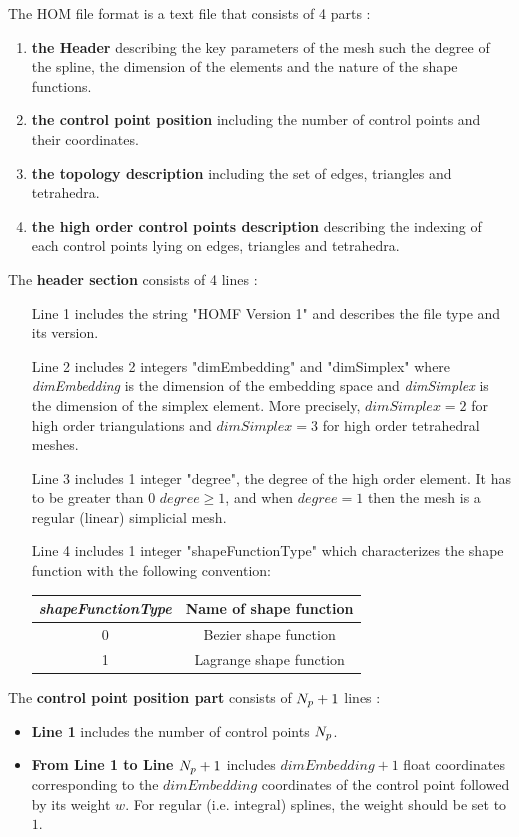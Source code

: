 \documentclass[a4paper,11pt]{article}
\begin{document}
The HOM file format is a text file that consists of 4 parts :
\begin{enumerate}
	\item {\bf the Header} describing the key parameters of the mesh such the degree of the spline, the dimension of the elements and the nature of the shape functions.
	\item {\bf the control point position} including the number of control points and their coordinates.
	\item {\bf the topology description} including the set of edges, triangles and tetrahedra. 
	\item {\bf the high order control points description} describing the indexing of each control points lying on edges, triangles and tetrahedra. 				
\end{enumerate}

The {\bf header section} consists of 4 lines :
\begin{itemize}
	\item[Line 1] includes the string "HOMF Version 1" and describes the file type and its version.
	\item[Line 2] includes 2 integers "dimEmbedding" and "dimSimplex" where  {\em dimEmbedding} is the dimension of the embedding space and {\em dimSimplex} is the dimension of the simplex element. More precisely, $dimSimplex=2$ for high order triangulations and $dimSimplex=3$ for high order tetrahedral meshes.
	\item[Line 3] includes 1 integer "degree", the degree of the high order element. It has to be greater than 0 $degree\geq 1$, and when $degree=1$ then the mesh is a regular (linear) simplicial mesh.
		\item[Line 4] includes 1 integer "shapeFunctionType" which characterizes the shape function with the following convention:  \begin{center}
\begin{tabular}{|c|c|} \hline 		{\em shapeFunctionType} & Name of shape function \\ \hline 	 0 & Bezier shape function  	 \\ \hline 1 & Lagrange shape function 	 \\ \hline \end{tabular} \end{center}
\end{itemize}


The {\bf control point position part} consists of ${N_{p}}+1$ lines : 
\begin{itemize}
\item {\bf Line 1} includes the number of control points ${N_{p}}$. 
\item {\bf From Line 1 to Line ${N_{p}}+1$} includes $dimEmbedding+1$ float coordinates corresponding to the $dimEmbedding$ coordinates of the control point followed by its weight $w$. For regular (i.e. integral) splines, the weight should be set to $1$. 
\end{itemize}
\end{document}
